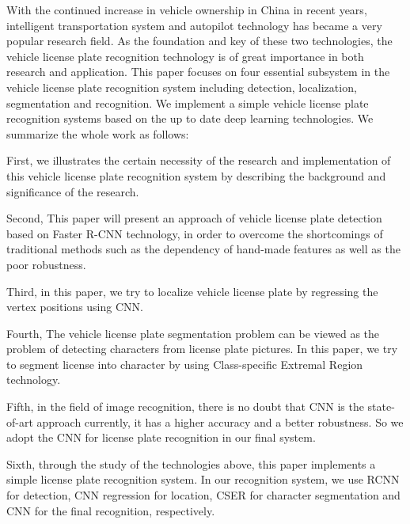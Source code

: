 \begin{enabstract}
With the continued increase in vehicle ownership in China in recent years,
intelligent transportation system and autopilot technology has became a very
popular research field. As the foundation and key of these two technologies,
the vehicle license plate recognition technology is of great importance in both
research and application. This paper focuses on four
essential subsystem in the vehicle license plate recognition system including
detection, localization, segmentation and recognition. We implement a simple vehicle
license plate recognition systems based on the up to date deep learning
technologies. We summarize the whole work as follows:

First, we illustrates the certain necessity of the research and implementation
of this vehicle license plate recognition system by describing the background and
significance of the research.

Second, This paper will
present an approach of vehicle license plate detection based on Faster R-CNN
technology, in order to overcome the shortcomings of traditional
methods such as the dependency of hand-made features as well as the
poor robustness.

Third, in this paper, we try to localize vehicle license plate by regressing the
vertex positions using CNN.

Fourth, The vehicle
license plate segmentation problem can be viewed as the problem of detecting
characters from license plate pictures. In this paper, we try to segment license
into character by using Class-specific Extremal Region technology.

Fifth, in the field of image recognition, there is no doubt that CNN is the
state-of-art approach currently, it has a higher accuracy and a better
robustness. So we adopt the CNN for license plate recognition in our final
system.

Sixth, through the study of the technologies above, this paper implements a
simple license plate recognition system. In our recognition system, we use RCNN
for detection, CNN regression for location, CSER for character segmentation and
CNN for the final recognition, respectively.
\end{enabstract}
